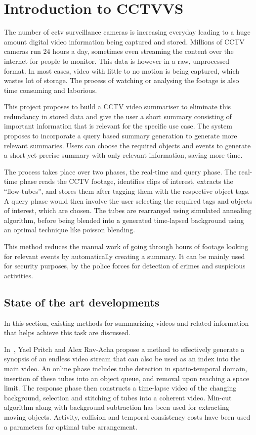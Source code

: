 \chapter{Introduction to CCTVVS}

The number of \gls{cctv} surveillance cameras is increasing everyday leading to
a huge amount digital video information being captured and stored. Millions of
CCTV cameras run 24 hours a day, sometimes even streaming the content over the
internet for people to monitor. This data is however in a raw, unprocessed
format.  In most cases, video with little to no motion is being captured,
which wastes lot of storage. The process of watching or analysing the footage is
also time consuming and laborious.

This project proposes to build a CCTV video summariser to eliminate this
redundancy in stored data and give the user a short summary consisting of
important information that is relevant for the specific use case. The system
proposes to incorporate a query based summary generation to generate more
relevant summaries. Users can choose the required objects and events to generate
a short yet precise summary with only relevant information, saving more time.

The process takes place over two phases, the real-time and query phase. The
real-time phase reads the CCTV footage, identifies clips of interest, extracts
the “flow-tubes”, and stores them after tagging them with the respective object
tags. A query phase would then involve the user selecting the required tags and
objects of interest, which are chosen. The tubes are rearranged using simulated
annealing algorithm, before being blended into a generated time-lapsed
background using an optimal technique like poisson blending.

This method reduces the manual work of going through hours of footage
looking for relevant events by automatically creating a summary. It can be
mainly used for security purposes, by the police forces for detection of crimes
and suspicious activities.


\section{State of the art developments}

In this section, existing methods for summarizing videos and related
information that helps achieve this task are discussed.

In~\cite{rav2006making}, Yael Pritch and Alex Rav-Acha propose a method to
effectively generate a synopsis of an endless video stream that can also be
used as an index into the main video. An online phase includes tube detection
in spatio-temporal domain, insertion of these tubes into an object queue, and
removal upon reaching a space limit. The response phase then constructs a
time-lapse video of the changing background, selection and stitching of tubes
into a coherent video. Min-cut algorithm along with background subtraction has
been used for extracting moving objects. Activity, collision and temporal
consistency costs have been used a parameters for optimal tube arrangement.

